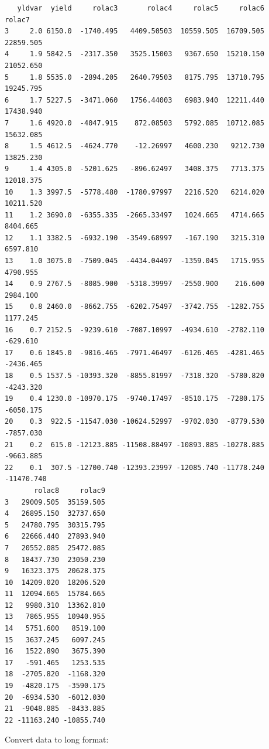 \documentclass[
  letterpaper,
  DIV=11,
  numbers=noendperiod]{scrartcl}
\begin{document}
\begin{verbatim}
   yldvar  yield     rolac3       rolac4     rolac5     rolac6     rolac7
3     2.0 6150.0  -1740.495   4409.50503  10559.505  16709.505  22859.505
4     1.9 5842.5  -2317.350   3525.15003   9367.650  15210.150  21052.650
5     1.8 5535.0  -2894.205   2640.79503   8175.795  13710.795  19245.795
6     1.7 5227.5  -3471.060   1756.44003   6983.940  12211.440  17438.940
7     1.6 4920.0  -4047.915    872.08503   5792.085  10712.085  15632.085
8     1.5 4612.5  -4624.770    -12.26997   4600.230   9212.730  13825.230
9     1.4 4305.0  -5201.625   -896.62497   3408.375   7713.375  12018.375
10    1.3 3997.5  -5778.480  -1780.97997   2216.520   6214.020  10211.520
11    1.2 3690.0  -6355.335  -2665.33497   1024.665   4714.665   8404.665
12    1.1 3382.5  -6932.190  -3549.68997   -167.190   3215.310   6597.810
13    1.0 3075.0  -7509.045  -4434.04497  -1359.045   1715.955   4790.955
14    0.9 2767.5  -8085.900  -5318.39997  -2550.900    216.600   2984.100
15    0.8 2460.0  -8662.755  -6202.75497  -3742.755  -1282.755   1177.245
16    0.7 2152.5  -9239.610  -7087.10997  -4934.610  -2782.110   -629.610
17    0.6 1845.0  -9816.465  -7971.46497  -6126.465  -4281.465  -2436.465
18    0.5 1537.5 -10393.320  -8855.81997  -7318.320  -5780.820  -4243.320
19    0.4 1230.0 -10970.175  -9740.17497  -8510.175  -7280.175  -6050.175
20    0.3  922.5 -11547.030 -10624.52997  -9702.030  -8779.530  -7857.030
21    0.2  615.0 -12123.885 -11508.88497 -10893.885 -10278.885  -9663.885
22    0.1  307.5 -12700.740 -12393.23997 -12085.740 -11778.240 -11470.740
       rolac8     rolac9
3   29009.505  35159.505
4   26895.150  32737.650
5   24780.795  30315.795
6   22666.440  27893.940
7   20552.085  25472.085
8   18437.730  23050.230
9   16323.375  20628.375
10  14209.020  18206.520
11  12094.665  15784.665
12   9980.310  13362.810
13   7865.955  10940.955
14   5751.600   8519.100
15   3637.245   6097.245
16   1522.890   3675.390
17   -591.465   1253.535
18  -2705.820  -1168.320
19  -4820.175  -3590.175
20  -6934.530  -6012.030
21  -9048.885  -8433.885
22 -11163.240 -10855.740
\end{verbatim}

Convert data to long format:
\end{document}
